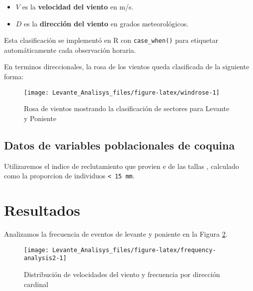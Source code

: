 \documentclass[
]{article}
\providecommand{\tightlist}{%
  \setlength{\itemsep}{0pt}\setlength{\parskip}{0pt}}
\begin{document}
\begin{itemize}
\tightlist
\item
  \(V\) es la \textbf{velocidad del viento} en m/s.
\item
  \(D\) es la \textbf{dirección del viento} en grados meteorológicos.
\end{itemize}

Esta clasificación se implementó en R con \texttt{case\_when()} para etiquetar automáticamente cada observación horaria.

En terminos direccionales, la rosa de los vientos queda clasificada de la siguiente forma:

\begin{figure}

{\centering \texttt{[image: Levante\_Analisys\_files/figure-latex/windrose-1]} 

}

\caption{Rosa de vientos mostrando la clasificación de sectores para Levante y Poniente}\label{fig:windrose}
\end{figure}

\subsection{Datos de variables poblacionales de coquina}\label{datos-de-variables-poblacionales-de-coquina}

Utilizaremos el indice de reclutamiento que provien e de las tallas , calculado como la proporcion de individuos \texttt{\textless{}\ 15\ mm}.

\newpage

\section{Resultados}\label{resultados}

Analizamos la frecuencia de eventos de levante y poniente en la Figura \ref{fig:frequency-analysis2}.

\begin{figure}

{\centering \texttt{[image: Levante\_Analisys\_files/figure-latex/frequency-analysis2-1]} 

}

\caption{Distribución de velocidades del viento y frecuencia por dirección cardinal}\label{fig:frequency-analysis2}
\end{figure}

\newpage
\end{document}
